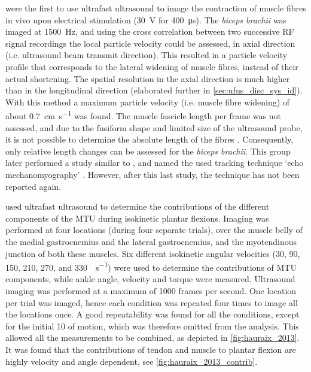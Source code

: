 \citet{deffieux_ultrafast_2006} were the first to use ultrafast ultrasound to image the contraction of muscle fibres in vivo upon electrical stimulation (\SI{30}{\volt} for \SI{400}{\micro\second}). The \textit{biceps brachii} was imaged at \SI{1500}{\hertz}, and using the cross correlation between two successive RF signal recordings the local particle velocity could be assessed, in axial direction (i.e. ultrasound beam transmit direction). This resulted in a particle velocity profile that corresponds to the lateral widening of muscle fibres, instead of their actual shortening. The spatial resolution in the axial direction is much higher than in the longitudinal direction (elaborated further in \autoref{sec:ufus_disc_sys_id}). With this method a maximum particle velocity (i.e. muscle fibre widening) of about \SI{0.7}{\centi\meter\per\second} was found. The muscle fascicle length per frame was not assessed, and due to the fusiform shape and limited size of the ultrasound probe, it is not possible to determine the absolute length of the fibres \cite{hodges_measurement_2003}. Consequently, only relative length changes can be assessed for the \textit{biceps brachii}. This group later performed a study similar to \cite{deffieux_ultrafast_2006}, and named the used tracking technique `echo mechanomyography' \cite{deffieux_assessment_2008}. However, after this last study, the technique has not been reported again. 


\citet{hauraix_shortening_2013} used ultrafast ultrasound to determine the contributions of the different components of the MTU during isokinetic plantar flexions. Imaging was performed at four locations (during four separate trials), over the muscle belly of the medial gastrocnemius and the lateral gastrocnemius, and the myotendinous junction of both these muscles. Six different isokinetic angular velocities (30, 90, 150, 210, 270, and \SI{330}{\deg\per\second}) were used to determine the contributions of MTU components, while ankle angle, velocity and torque were measured. Ultrasound imaging was performed at a maximum of 1000 frames per second. One location per trial was imaged, hence each condition was repeated four times to image all the locations once. A good repeatability was found for all the conditions, except for the initial \SI{10}{\deg} of motion, which was therefore omitted from the analysis. This allowed all the measurements to be combined, as depicted in \autoref{fig:hauraix_2013}. It was found that the contributions of tendon and muscle to plantar flexion are highly velocity and angle dependent, see \autoref{fig:hauraix_2013_contrib}. 


